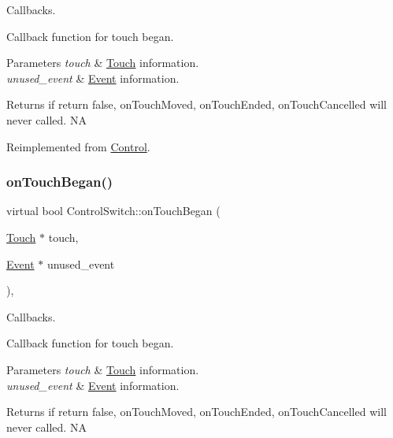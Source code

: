 Callbacks. 

Callback function for touch began.


\begin{DoxyParams}{Parameters}
{\em touch} & \hyperlink{classTouch}{Touch} information. \\
\hline
{\em unused\+\_\+event} & \hyperlink{classEvent}{Event} information. \\
\hline
\end{DoxyParams}
\begin{DoxyReturn}{Returns}
if return false, on\+Touch\+Moved, on\+Touch\+Ended, on\+Touch\+Cancelled will never called.  NA 
\end{DoxyReturn}


Reimplemented from \hyperlink{classControl_a0cf2e20cea5b57b263e965be4a19ab52}{Control}.

\mbox{\label{classControlSwitch_aaba407c9125d0e4cc85fb5ae59ea964c}} 
\subsubsection{\texorpdfstring{on\+Touch\+Began()}{onTouchBegan()}\hspace{0.1cm}{\footnotesize\ttfamily [2/2]}}
{\footnotesize\ttfamily virtual bool Control\+Switch\+::on\+Touch\+Began (\begin{DoxyParamCaption}\item[{\hyperlink{classTouch}{Touch} $\ast$}]{touch,  }\item[{\hyperlink{classEvent}{Event} $\ast$}]{unused\+\_\+event }\end{DoxyParamCaption})\hspace{0.3cm}{\ttfamily [override]}, {\ttfamily [virtual]}}



Callbacks. 

Callback function for touch began.


\begin{DoxyParams}{Parameters}
{\em touch} & \hyperlink{classTouch}{Touch} information. \\
\hline
{\em unused\+\_\+event} & \hyperlink{classEvent}{Event} information. \\
\hline
\end{DoxyParams}
\begin{DoxyReturn}{Returns}
if return false, on\+Touch\+Moved, on\+Touch\+Ended, on\+Touch\+Cancelled will never called.  NA 
\end{DoxyReturn}


